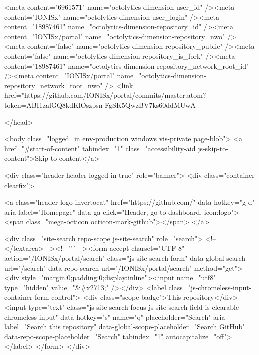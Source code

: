   <meta content="6961571" name="octolytics-dimension-user_id" /><meta content="IONISx" name="octolytics-dimension-user_login" /><meta content="18987461" name="octolytics-dimension-repository_id" /><meta content="IONISx/portal" name="octolytics-dimension-repository_nwo" /><meta content="false" name="octolytics-dimension-repository_public" /><meta content="false" name="octolytics-dimension-repository_is_fork" /><meta content="18987461" name="octolytics-dimension-repository_network_root_id" /><meta content="IONISx/portal" name="octolytics-dimension-repository_network_root_nwo" />
  <link href="https://github.com/IONISx/portal/commits/master.atom?token=ABI1zalGQ8kdKlOszpsn-FgSK5QwzBV7ks60ddMUwA%

  </head>


  <body class="logged_in   env-production windows vis-private page-blob">
    <a href="#start-of-content" tabindex="1" class="accessibility-aid js-skip-to-content">Skip to content</a>

    
    
    



      <div class="header header-logged-in true" role="banner">
  <div class="container clearfix">

    <a class="header-logo-invertocat" href="https://github.com/" data-hotkey="g d" aria-label="Homepage" data-ga-click="Header, go to dashboard, icon:logo">
  <span class="mega-octicon octicon-mark-github"></span>
</a>


      <div class="site-search repo-scope js-site-search" role="search">
          <!-- </textarea> --><!-- '"` --><form accept-charset="UTF-8" action="/IONISx/portal/search" class="js-site-search-form" data-global-search-url="/search" data-repo-search-url="/IONISx/portal/search" method="get"><div style="margin:0;padding:0;display:inline"><input name="utf8" type="hidden" value="&#x2713;" /></div>
  <label class="js-chromeless-input-container form-control">
    <div class="scope-badge">This repository</div>
    <input type="text"
      class="js-site-search-focus js-site-search-field is-clearable chromeless-input"
      data-hotkey="s"
      name="q"
      placeholder="Search"
      aria-label="Search this repository"
      data-global-scope-placeholder="Search GitHub"
      data-repo-scope-placeholder="Search"
      tabindex="1"
      autocapitalize="off">
  </label>
</form>
      </div>

